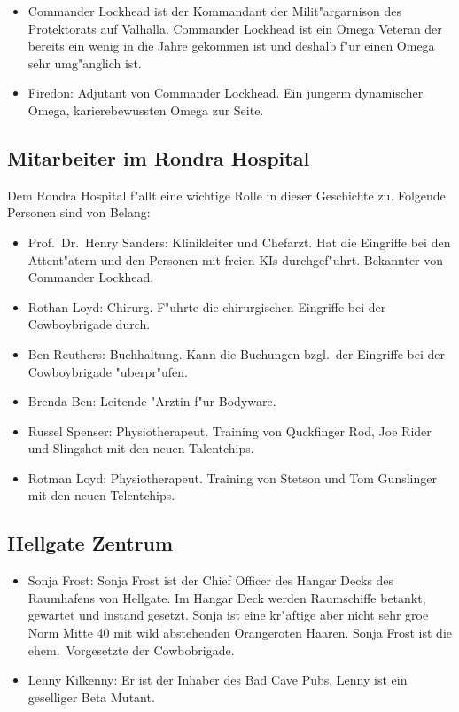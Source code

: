 \begin{itemize}
    \item Commander Lockhead ist der Kommandant der Milit"argarnison des Protektorats auf Valhalla. Commander Lockhead ist ein Omega Veteran der bereits ein wenig in die Jahre gekommen ist und deshalb f"ur einen Omega sehr umg"anglich ist. 
    \item Firedon: Adjutant von Commander Lockhead. Ein jungerm dynamischer Omega, karierebewussten Omega zur Seite.
\end{itemize}

\subsection{Mitarbeiter im Rondra Hospital}

Dem Rondra Hospital f"allt eine wichtige Rolle in dieser Geschichte zu. Folgende Personen sind von Belang:

\begin{itemize}
    \item Prof.~Dr.~Henry Sanders: Klinikleiter und Chefarzt. Hat die Eingriffe bei den Attent"atern und den Personen mit freien KIs durchgef"uhrt. Bekannter von Commander Lockhead.
    \item Rothan Loyd: Chirurg. F"uhrte die chirurgischen Eingriffe bei der Cowboybrigade durch.
    \item Ben Reuthers: Buchhaltung. Kann die Buchungen bzgl.~der Eingriffe bei der Cowboybrigade "uberpr"ufen.
    \item Brenda Ben: Leitende "Arztin f"ur Bodyware.
    \item Russel Spenser: Physiotherapeut. Training von Quckfinger Rod, Joe Rider und Slingshot mit den neuen Talentchips.
    \item Rotman Loyd: Physiotherapeut. Training von Stetson und Tom Gunslinger mit den neuen Telentchips.    
\end{itemize}

\subsection{Hellgate Zentrum}

\begin{itemize}
    \item Sonja Frost: Sonja Frost ist der Chief Officer des Hangar Decks des Raumhafens von Hellgate. Im Hangar Deck werden Raumschiffe betankt, gewartet und instand gesetzt. Sonja ist eine kr"aftige aber nicht sehr gro\3e Norm Mitte 40 mit wild abstehenden Orangeroten Haaren. Sonja Frost ist die ehem.~Vorgesetzte der Cowbobrigade.
    \item Lenny Kilkenny: Er ist der Inhaber des Bad Cave Pubs. Lenny ist ein geselliger Beta Mutant.
\end{itemize}

